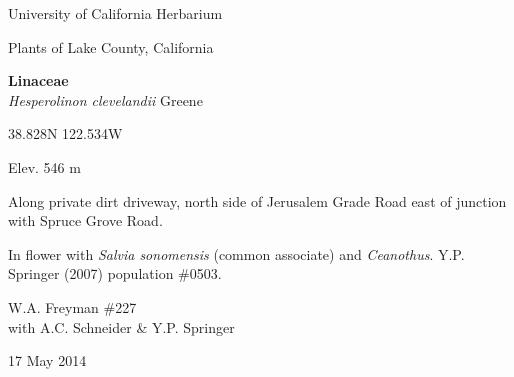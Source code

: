 \documentclass[letterpaper,10pt]{article}
\begin{document}
\begin{minipage}[t]{0.40\textwidth}

\begin{center}
University of California Herbarium \\
\begin{large}
Plants of Lake County, California \\
\end{large}
\vspace{\baselineskip}
\textbf{Linaceae} \\
\textit{Hesperolinon clevelandii} Greene\\
\end{center}

\begin{footnotesize}

\begin{multicols}{2}
38.828\textdegree N 122.534\textdegree W
\columnbreak
\begin{flushright}
Elev. 546 m
\end{flushright}
\end{multicols}

Along private dirt driveway, north side of Jerusalem Grade Road east of junction with Spruce Grove Road.
\vspace{\baselineskip}

In flower with \textit{Salvia sonomensis} (common associate) and \textit{Ceanothus}. Y.P. Springer (2007) population \#0503.

\begin{multicols}{2}
W.A. Freyman \#227 \\
with A.C. Schneider \& Y.P. Springer
\columnbreak
\begin{flushright}
17 May 2014
\end{flushright}
\end{multicols}

\end{footnotesize}

\end{minipage}

\vspace{2cm}
%
%

%
%
\end{document}
